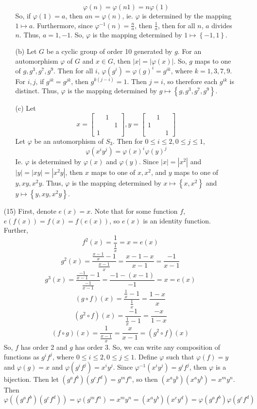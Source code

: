 \documentclass[12pt]{article}
\begin{document}
\begin{itemize}
\begin{itemize}
$$\varphi(n) = \varphi(n1) = n\varphi(1)$$
So, if $\varphi(1) = a$, then $an = \varphi(n)$, ie. $\varphi$ is determined by the mapping $1 \mapsto a$. Furthermore, since $\varphi^{-1}(n) = \frac{n}{a}$, then $\frac{1}{a}$, then for all $n$, $a$ divides $n$. Thus, $a = 1, -1$. So, $\varphi$ is the mapping determined by $1 \mapsto \left\lbrace -1, 1 \right\rbrace$.
\item[(b)]
Let $G$ be a cyclic group of order 10 generated by $g$. For an automorphism $\varphi$ of $G$ and $x \in G$, then $|x| = |\varphi(x)|$. So, $g$ maps to one of $g, g^3, g^7, g^9$. Then for all $i$, $\varphi(g^i) = \varphi(g)^i = g^{ik}$, where $k = 1, 3, 7, 9$. For $i, j$, if $g^{ik} = g^{jk}$, then $g^{k(j - i)} = 1$. Then $j = i$, so therefore each $g^{ik}$ is distinct. Thus, $\varphi$ is the mapping determined by $g \mapsto \left\lbrace g, g^3, g^7, g^9 \right\rbrace$.
\item[(c)]
Let
$$x = \begin{bmatrix}
& 1 \\
& & 1 \\
1
\end{bmatrix}, y = \begin{bmatrix}
& 1 \\
1 \\
& & 1
\end{bmatrix}$$
Let $\varphi$ be an automorphism of $S_3$. Then for $0 \leq i \leq 2,  0\leq j \leq 1$, 
$$\varphi(x^iy^j) = \varphi(x)^i\varphi(y)^j$$
Ie. $\varphi$ is determined by $\varphi(x)$ and $\varphi(y)$. Since $|x| = |x^2|$ and $|y| = |xy| = |x^2y|$, then $x$ maps to one of $x, x^2$, and $y$ maps to one of $y, xy, x^2y$. Thus, $\varphi$ is the mapping determined by $x \mapsto \left\lbrace x, x^2 \right\rbrace$ and $y \mapsto \left\lbrace y, xy, x^2y \right\rbrace$.
\end{itemize}
\item[(15)]
First, denote $e(x) = x$. Note that for some function $f$, $e(f(x)) = f(x) = f(e(x))$, so $e(x)$ is an identity function. Further,
$$f^2(x) = \frac{1}{\frac{1}{x}} = x = e(x)$$
$$g^2(x) = \frac{\frac{x-1}{x} - 1}{\frac{x-1}{x}} = \frac{x- 1 - x}{x - 1} = \frac{-1}{x-1}$$
$$g^3(x) = \frac{\frac{-1}{x-1}-1}{\frac{-1}{x-1}} = \frac{-1 - (x-1)}{-1} = x = e(x)$$
$$(g \circ f)(x) = \frac{\frac{1}{x} - 1}{\frac{1}{x}} = \frac{1 - x}{x}$$
$$(g^2 \circ f)(x) = \frac{-1}{\frac{1}{x} - 1} = \frac{-x}{1 - x}$$
$$(f \circ g)(x) = \frac{1}{\frac{x-1}{x}} = \frac{x}{x-1} = (g^2 \circ f)(x)$$
So, $f$ has order 2 and $g$ has order 3. So, we can write any composition of functions as $g^if^j$, where $0 \leq i \leq 2, 0 \leq j \leq 1$. Define $\varphi$ such that $\varphi(f) = y$ and $\varphi(g) = x$ and $\varphi(g^if^j) = x^iy^j$. Since $\varphi^{-1}(x^iy^j) = g^if^j$, then $\varphi$ is a bijection. Then let $(g^af^b)(g^cf^d) = g^mf^n$, so then $(x^ay^b)(x^ay^b) = x^my^n$. Then $$\varphi((g^af^b)(g^cf^d)) = \varphi(g^mf^n) = x^my^n = (x^ay^b)(x^cy^d) = \varphi(g^af^b)\varphi(g^cf^d)$$

\end{itemize}
\end{document}

